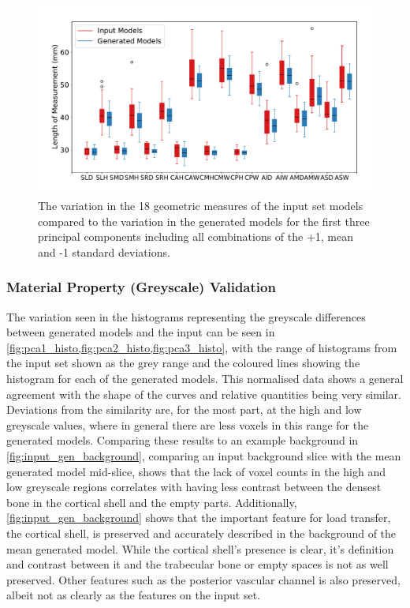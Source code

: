 \begin{figure}[h!]
  \centering
  \includegraphics[width=\textwidth]{Chapters/Chapter_PCA_images/pca_cube.pdf}
	\caption[Geometric variation in the generated vertebrae.]{The variation in the 18 geometric measures of the input set models compared to the variation in the generated models for the first three principal components including all combinations of the +1, mean and -1 standard deviations.}
  \label{fig:pca_cube}
\end{figure}

\subsubsection{Material Property (Greyscale) Validation}


The variation seen in the histograms representing the greyscale differences
between generated models and the input can be seen in
\cref{fig:pca1_histo,fig:pca2_histo,fig:pca3_histo}, with the range of
histograms from the input set shown as the grey range and the coloured lines
showing the histogram for each of the generated models.  This normalised data
shows a general agreement with the shape of the curves and relative quantities
being very similar.  Deviations from the similarity are, for the most part, at
the high and low greyscale values, where in general there are less voxels in
this range for the generated models.  Comparing these results to an example
background in \cref{fig:input_gen_background}, comparing an input background
slice with the mean generated model mid-slice, shows that the lack of voxel
counts in the high and low greyscale regions correlates with having less
contrast between the densest bone in the cortical shell and the empty parts.
Additionally, \cref{fig:input_gen_background} shows that the important feature
for load transfer, the cortical shell, is preserved and accurately described in
the background of the mean generated model.  While the cortical shell's
presence is clear, it's definition and contrast between it and the trabecular
bone or empty spaces is not as well preserved.  Other features such as the
posterior vascular channel is also preserved, albeit not as clearly as the
features on the input set.

